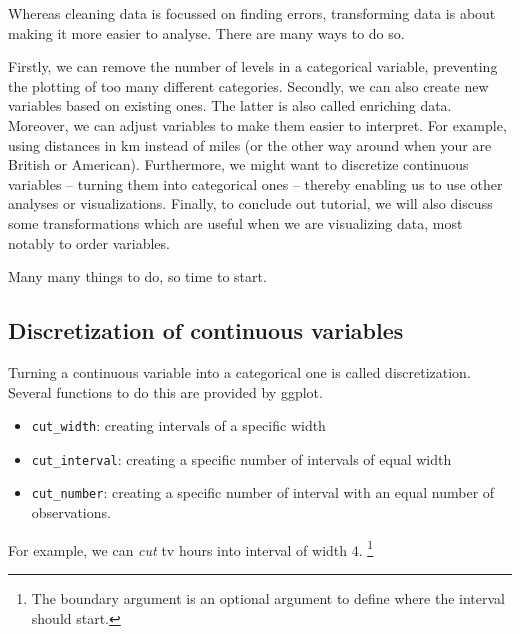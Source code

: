\documentclass[]{tufte-book}
\newenvironment{Shaded}{}{}
\newcommand{\DataTypeTok}[1]{\textcolor[rgb]{0.56,0.13,0.00}{#1}}
\newcommand{\DecValTok}[1]{\textcolor[rgb]{0.25,0.63,0.44}{#1}}
\newcommand{\KeywordTok}[1]{\textcolor[rgb]{0.00,0.44,0.13}{\textbf{#1}}}
\newcommand{\NormalTok}[1]{#1}
\newcommand{\OperatorTok}[1]{\textcolor[rgb]{0.40,0.40,0.40}{#1}}
\newcommand{\StringTok}[1]{\textcolor[rgb]{0.25,0.44,0.63}{#1}}
\providecommand{\tightlist}{%
  \setlength{\itemsep}{0pt}\setlength{\parskip}{0pt}}
\begin{document}
Whereas cleaning data is focussed on finding errors, transforming data is about making it more easier to analyse. There are many ways to do so.

Firstly, we can remove the number of levels in a categorical variable, preventing the plotting of too many different categories. Secondly, we can also create new variables based on existing ones. The latter is also called enriching data. Moreover, we can adjust variables to make them easier to interpret. For example, using distances in km instead of miles (or the other way around when your are British or American). Furthermore, we might want to discretize continuous variables -- turning them into categorical ones -- thereby enabling us to use other analyses or visualizations. Finally, to conclude out tutorial, we will also discuss some transformations which are useful when we are visualizing data, most notably to order variables.

Many many things to do, so time to start.

\hypertarget{discretization-of-continuous-variables}{%
\subsection{Discretization of continuous variables}\label{discretization-of-continuous-variables}}

Turning a continuous variable into a categorical one is called discretization. Several functions to do this are provided by ggplot.

\begin{itemize}
\tightlist
\item
  \texttt{cut\_width}: creating intervals of a specific width
\item
  \texttt{cut\_interval}: creating a specific number of intervals of equal width
\item
  \texttt{cut\_number}: creating a specific number of interval with an equal number of observations.
\end{itemize}

For example, we can \emph{cut} tv hours into interval of width 4. \footnote{The boundary argument is an optional argument to define where the interval should start.}

\begin{Shaded}
\end{Shaded}
\end{document}
